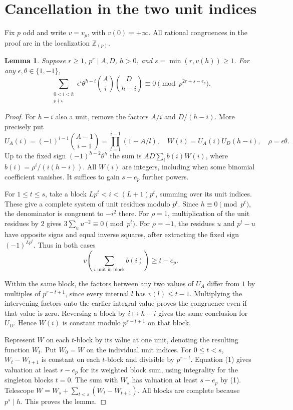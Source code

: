 \documentclass[11pt]{article}
\newtheorem{lemma}[theorem]{Lemma}
\newcommand{\Z}{\mathbb Z}
\begin{document}
\section{Cancellation in the two unit indices}
Fix $p$ odd and write $v=v_p$, with $v(0)=+\infty$. All rational congruences in the proof are in the localization $\Z_{(p)}$.
\begin{lemma}\label{unit}
Suppose $r\ge1$, $p^r\mid A,D$, $h>0$, and $s=\min(r,v(h))\ge1$. For any $\epsilon,\theta\in\{1,-1\}$,
\[
 \sum_{\substack{0<i<h\\p\nmid i}}\epsilon^i\theta^{h-i}
                 \binom Ai\binom D{h-i}\equiv0\pmod {p^{2r+s-e_p}}.
\]
\end{lemma}
\begin{proof}
For $h-i$ also a unit, remove the factors $A/i$ and $D/(h-i)$. More precisely put
\[
 U_A(i)=(-1)^{i-1}\binom{A-1}{i-1}
       =\prod_{l=1}^{i-1}(1-A/l),\quad
 W(i)=U_A(i)U_D(h-i),\quad \rho=\epsilon\theta .
\]
Up to the fixed sign $(-1)^{h-2}\theta^h$ the sum is
$AD\sum_i b(i)W(i)$, where $b(i)=\rho^i/(i(h-i))$.
All $W(i)$ are integers, including when some binomial coefficient vanishes. It suffices to gain $s-e_p$ further powers.

For $1\le t\le s$, take a block $Lp^t<i<(L+1)p^t$, summing over its unit indices. These give a complete system of unit residues modulo $p^t$. Since $h\equiv0\pmod {p^t}$, the denominator is congruent to $-i^2$ there. For $\rho=1$, multiplication of the unit residues by $2$ gives $3\sum_{u}u^{-2}\equiv0\pmod{p^t}$. For $\rho=-1$, the residues $u$ and $p^t-u$ have opposite signs and equal inverse squares, after extracting the fixed sign $(-1)^{Lp^t}$. Thus in both cases
\[
 v\!\left(\sum_{i\text{ unit in block}} b(i)\right)\ge t-e_p. \tag{1}
\]

Within the same block, the factors between any two values of $U_A$ differ from $1$ by multiples of $p^{r-t+1}$, since every internal $l$ has $v(l)\le t-1$. Multiplying the intervening factors onto the earlier integral value proves the congruence even if that value is zero. Reversing a block by $i\mapsto h-i$ gives the same conclusion for $U_D$. Hence $W(i)$ is constant modulo $p^{r-t+1}$ on that block.

Represent $W$ on each $t$-block by its value at one unit, denoting the resulting function $W_t$. Put $W_0=W$ on the individual unit indices. For $0\le t<s$, $W_t-W_{t+1}$ is constant on each $t$-block and divisible by $p^{r-t}$. Equation (1) gives valuation at least $r-e_p$ for its weighted block sum, using integrality for the singleton blocks $t=0$. The sum with $W_s$ has valuation at least $s-e_p$ by (1). Telescope $W=W_s+\sum_{t<s}(W_t-W_{t+1})$. All blocks are complete because $p^s\mid h$. This proves the lemma.
\end{proof}
\end{document}
